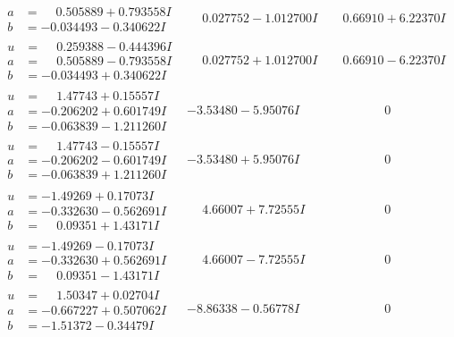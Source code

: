 \documentclass[1p]{elsarticle_modified}
\theoremstyle{definition}
\begin{document}
$$\begin{array}{c|c|c}
\begin{aligned}
a &= \phantom{-}0.505889 + 0.793558 I \\
b &= -0.034493 - 0.340622 I\end{aligned}
 & \phantom{-}0.027752 - 1.012700 I & \phantom{-}0.66910 + 6.22370 I \\ \hline\begin{aligned}
u &= \phantom{-}0.259388 - 0.444396 I \\
a &= \phantom{-}0.505889 - 0.793558 I \\
b &= -0.034493 + 0.340622 I\end{aligned}
 & \phantom{-}0.027752 + 1.012700 I & \phantom{-}0.66910 - 6.22370 I \\ \hline\begin{aligned}
u &= \phantom{-}1.47743 + 0.15557 I \\
a &= -0.206202 + 0.601749 I \\
b &= -0.063839 - 1.211260 I\end{aligned}
 & -3.53480 - 5.95076 I & \phantom{-0.000000 } 0 \\ \hline\begin{aligned}
u &= \phantom{-}1.47743 - 0.15557 I \\
a &= -0.206202 - 0.601749 I \\
b &= -0.063839 + 1.211260 I\end{aligned}
 & -3.53480 + 5.95076 I & \phantom{-0.000000 } 0 \\ \hline\begin{aligned}
u &= -1.49269 + 0.17073 I \\
a &= -0.332630 - 0.562691 I \\
b &= \phantom{-}0.09351 + 1.43171 I\end{aligned}
 & \phantom{-}4.66007 + 7.72555 I & \phantom{-0.000000 } 0 \\ \hline\begin{aligned}
u &= -1.49269 - 0.17073 I \\
a &= -0.332630 + 0.562691 I \\
b &= \phantom{-}0.09351 - 1.43171 I\end{aligned}
 & \phantom{-}4.66007 - 7.72555 I & \phantom{-0.000000 } 0 \\ \hline\begin{aligned}
u &= \phantom{-}1.50347 + 0.02704 I \\
a &= -0.667227 + 0.507062 I \\
b &= -1.51372 - 0.34479 I\end{aligned}
 & -8.86338 - 0.56778 I & \phantom{-0.000000 } 0 \\ \hline\begin{aligned}

\end{aligned}
\end{array}$$
\end{document}
